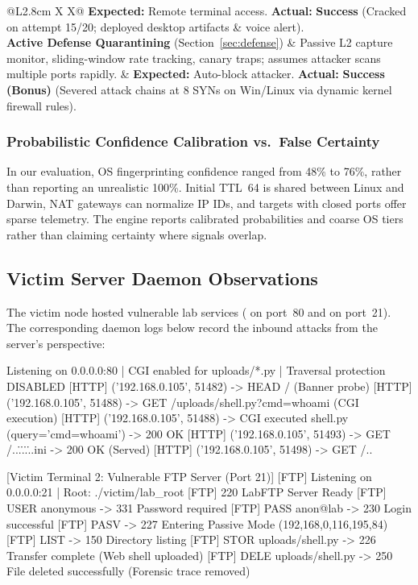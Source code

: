 \begin{table}[!ht]
\begin{tabularx}{\textwidth}{@{}L{2.8cm} X X@{}}
\textbf{Expected:} Remote terminal access.\newline
\textbf{Actual:} \textbf{Success} (Cracked on attempt 15/20; deployed desktop artifacts \& voice alert).\\
\addlinespace[2pt]
\textbf{Active Defense Quarantining} (Section~\ref{sec:defense}) &
Passive L2 capture monitor, sliding-window rate tracking, canary traps; assumes attacker scans multiple ports rapidly. &
\textbf{Expected:} Auto-block attacker.\newline
\textbf{Actual:} \textbf{Success (Bonus)} (Severed attack chains at 8 SYNs on Win/Linux via dynamic kernel firewall rules).\\
\bottomrule
\end{tabularx}
\end{table}

\subsubsection{Probabilistic Confidence Calibration vs.\ False Certainty}
In our evaluation, OS fingerprinting confidence ranged from 48\% to 76\%, rather than reporting
an unrealistic 100\%. Initial TTL~64 is shared between Linux and Darwin, NAT gateways can normalize
IP IDs, and targets with closed ports offer sparse telemetry. The engine reports calibrated
probabilities and coarse OS tiers rather than claiming certainty where signals overlap.

\FloatBarrier
\subsection{Victim Server Daemon Observations}
The victim node hosted vulnerable lab services ( on port~80 and
 on port~21). The corresponding daemon logs below record the inbound
attacks from the server's perspective:

\begin{logbox}
 Listening on 0.0.0.0:80 | CGI enabled for uploads/*.py | Traversal protection DISABLED
[HTTP] ('192.168.0.105', 51482) -> HEAD /                               (Banner probe)
[HTTP] ('192.168.0.105', 51488) -> GET /uploads/shell.py?cmd=whoami      (CGI execution)
[HTTP] ('192.168.0.105', 51488) -> CGI executed shell.py (query='cmd=whoami') -> 200 OK
[HTTP] ('192.168.0.105', 51493) -> GET /..\..\..\..\..\windows\win.ini   -> 200 OK (Served)
[HTTP] ('192.168.0.105', 51498) -> GET /..%

[Victim Terminal 2: Vulnerable FTP Server (Port 21)]
[FTP] Listening on 0.0.0.0:21 | Root: ./victim/lab_root
[FTP] 220 LabFTP Server Ready
[FTP] USER anonymous -> 331 Password required
[FTP] PASS anon@lab -> 230 Login successful
[FTP] PASV -> 227 Entering Passive Mode (192,168,0,116,195,84)
[FTP] LIST -> 150 Directory listing
[FTP] STOR uploads/shell.py -> 226 Transfer complete (Web shell uploaded)
[FTP] DELE uploads/shell.py -> 250 File deleted successfully (Forensic trace removed)
\end{logbox}

